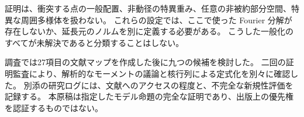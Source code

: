 \documentclass[12pt]{amsart}
\theoremstyle{definition}
\theoremstyle{remark}
\numberwithin{equation}{section}
\theoremstyle{definition}
\begin{document}
証明は、衝突する点の一般配置、非動径の特異重み、任意の非被約部分空間、特異な周囲多様体を扱わない。
これらの設定では、ここで使った Fourier 分解が存在しないか、延長元のノルムを別に定義する必要がある。
こうした一般化のすべてが未解決であると分類することはしない。

調査では27項目の文献マップを作成した後に九つの候補を検討した。
二回の証明監査により、解析的なモーメントの議論と核行列による定式化を別々に確認した。
別添の研究ログには、文献へのアクセスの程度と、不完全な新規性評価を記録する。
本原稿は指定したモデル命題の完全な証明であり、出版上の優先権を認証するものではない。

\begingroup
\renewcommand{\refname}{参考文献}
\makeatletter
\renewcommand{\bibitem}[2][]{\item[\hfil\@biblabel{#1}]}
\makeatother
{}
\endgroup
\end{document}
